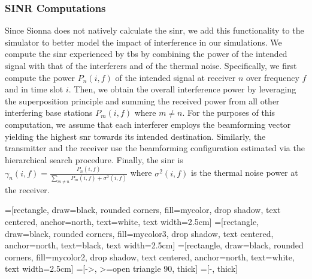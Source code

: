 \subsubsection{SINR Computations}

Since Sionna does not natively calculate the \gls{sinr}, we add this functionality to the simulator to better model the impact of interference in our simulations. We compute the \gls{sinr} experienced by \glspl{tb} by combining the power of the intended signal with that of the interferers and of the thermal noise. Specifically, we first compute the power $P_{n}(i,f)$ of the intended signal at receiver $n$ over frequency $f$ and in time slot $i$. Then, we obtain the overall interference power by leveraging the superposition principle and summing the received power from all other interfering base stations $P_{m} (i, f)$ where $m \neq n$. For the purposes of this computation, we assume that each interferer employs the beamforming vector yielding the highest \gls{snr} towards its intended destination. Similarly, the transmitter and the receiver use the beamforming configuration estimated via the hierarchical search procedure. Finally, the \gls{sinr} is $
\label{EQ_CGAN1}
\gamma_{n} (i, f)= \frac{P_{n}(i,f)}{\sum\limits_{m \neq n} P_{m}(i,f) + \sigma^2(i,f)}
$
where $\sigma^2(i,f)$ is the thermal noise power at the receiver.





\usetikzlibrary{positioning,shapes,shadows,arrows}
=[rectangle, draw=black, rounded corners, fill=mycolor, drop shadow,
        text centered, anchor=north, text=white, text width=2.5cm]
=[rectangle, draw=black, rounded corners, fill=mycolor3, drop shadow,
        text centered, anchor=north, text=black, text width=2.5cm]
=[rectangle, draw=black, rounded corners, fill=mycolor2, drop shadow,
        text centered, anchor=north, text=white, text width=2.5cm]
=[->, >=open triangle 90, thick]
=[-, thick]
        
